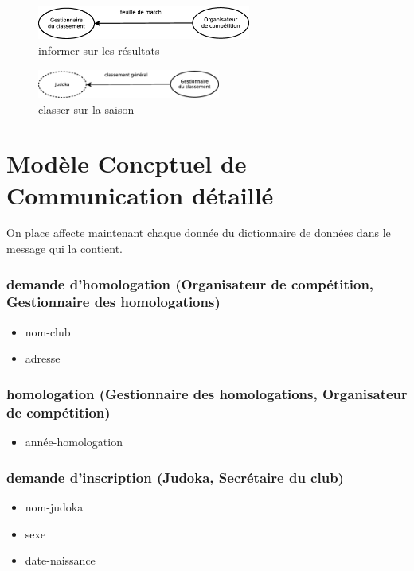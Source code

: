\begin{figure}[!htb]
    \begin{center}
    \includegraphics[width=7cm]{images/cc2_mcc4.eps}
    \caption{\label{cc2_mcc4} informer sur les résultats}
    \end{center}
\end{figure}

\begin{figure}[!htb]
    \begin{center}
    \includegraphics[width=6cm]{images/cc2_mcc6.eps}
    \caption{\label{cc2_mcc5} classer sur la saison}
    \end{center}
\end{figure}

\newpage
\section*{Modèle Concptuel de Communication détaillé}

On place affecte maintenant chaque donnée du dictionnaire de données dans le message qui la contient.

\subsubsection*{demande d'homologation (Organisateur de compétition, Gestionnaire des homologations)}
\begin{itemize}
    \item nom-club
    \item adresse
\end{itemize}

\subsubsection*{homologation (Gestionnaire des homologations, Organisateur de compétition)}
\begin{itemize}
    \item année-homologation
\end{itemize}

\subsubsection*{demande d'inscription (Judoka, Secrétaire du club)}
\begin{itemize}
    \item nom-judoka
    \item sexe
    \item date-naissance
\end{itemize}

